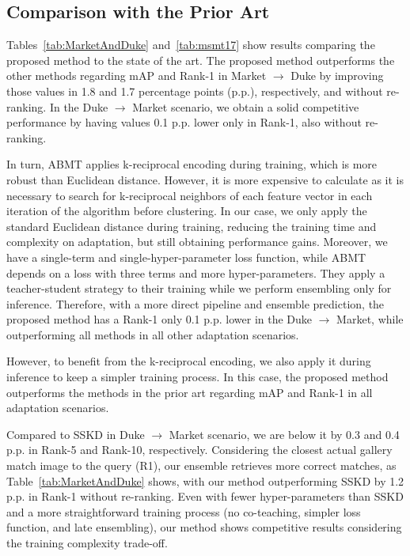 \documentclass[journal]{IEEEtran}
\begin{document}
\subsection{Comparison with the Prior Art}
Tables~\ref{tab:MarketAndDuke} and~\ref{tab:msmt17} show results comparing the proposed method to the state of the art. The proposed method outperforms the other methods regarding mAP and Rank-1 in Market $\rightarrow $ Duke by improving those values in 1.8 and 1.7 percentage points (p.p.), respectively, and without re-ranking. In the Duke $\rightarrow $ Market scenario, we obtain a solid competitive performance by having values 0.1 p.p. lower only in Rank-1, also without re-ranking. 
 
In turn, ABMT applies k-reciprocal encoding during training, which is more robust than Euclidean distance. 
However, it is more expensive to calculate as it is necessary to search for k-reciprocal neighbors of each feature vector in each iteration of the algorithm before clustering. In our case, we only apply the standard Euclidean distance during training, reducing the training time and complexity on adaptation, but still obtaining performance gains. Moreover, we have a single-term and single-hyper-parameter loss function, while ABMT depends on a loss with three terms and more hyper-parameters. They apply a teacher-student strategy to their training while we perform ensembling only for inference. Therefore, with a more direct pipeline and ensemble prediction, the proposed method has a Rank-1 only 0.1 p.p. lower in the Duke $\rightarrow $ Market, while outperforming all methods in all other adaptation scenarios. 



However, to benefit from the k-reciprocal encoding, we also apply it during inference to keep a simpler training process. In this case, the proposed method outperforms the methods in the prior art regarding mAP and Rank-1 in all adaptation scenarios.  \par 

Compared to SSKD in Duke $\rightarrow$ Market scenario, we are below it by 0.3 and 0.4 p.p. in Rank-5 and Rank-10, respectively. Considering the closest actual gallery match image to the query (R1), our ensemble retrieves more correct matches, as Table~\ref{tab:MarketAndDuke} shows, with our method outperforming SSKD by 1.2 p.p. in Rank-1 without re-ranking. Even with fewer hyper-parameters than SSKD and a more straightforward training process (no co-teaching, simpler loss function, and late ensembling), our method shows competitive results considering the training complexity trade-off.
\end{document}

